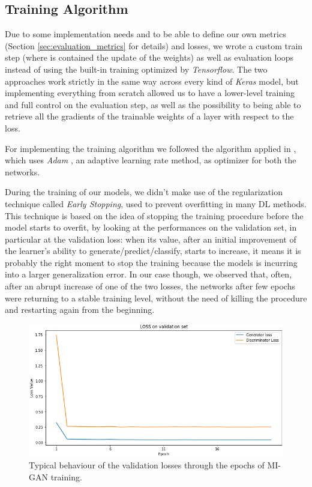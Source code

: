 \subsection{Training Algorithm}
\label{subsec:training_algorithm}
Due to some implementation needs and to be able to define our own metrics (Section \ref{sec:evaluation_metrics} for details) and losses, we wrote a custom train step (where is contained the update of the weights) as well as evaluation loops instead of using the built-in training optimized by \textit{Tensorflow}. The two approaches work strictly in the same way across every kind of \textit{Keras} model, but implementing everything from scratch allowed us to have a lower-level training and full control on the evaluation step, as well as the possibility to being able to retrieve all the gradients of the trainable weights of a layer with respect to the loss.  

For implementing the training algorithm we followed the algorithm applied in \cite{pix2pix_implementation}, which uses \textit{Adam} \cite{kingma2014adam}, an adaptive learning rate method, as optimizer for both the networks.

\vspace{5mm} %
During the training of our models, we didn't make use of the regularization technique called \textit{Early Stopping}, used to prevent overfitting in many \ac{DL} methods. This technique is based on the idea of stopping the training procedure before the model starts to overfit, by looking at the performances on the validation set, in particular at the validation loss: when its value, after an initial improvement of the learner's ability to generate/predict/classify, starts to increase, it means it is probably the right moment to stop the training because the models is incurring into a larger generalization error. In our case though, we observed that, often, after an abrupt increase of one of the two losses, the networks after few epochs were returning to a stable training level, without the need of killing the procedure and restarting again from the beginning. 

\begin{figure}[H]
\centering
\includegraphics[height=0.331\textheight]{images/loss_behaviour2.pdf}
\caption[Validation loss during MI-GAN training]{Typical behaviour of the validation losses through the epochs of MI-GAN training.}
\label{fig:loss_behaviour}
\end{figure}

